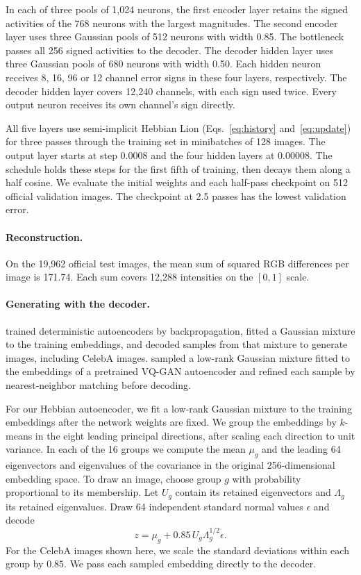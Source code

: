 \documentclass[10pt]{article}
\begin{document}
In each of three pools of 1,024 neurons, the first encoder layer retains the signed activities of the 768 neurons with the largest magnitudes. The second encoder layer uses three Gaussian pools of 512 neurons with width 0.85. The bottleneck passes all 256 signed activities to the decoder. The decoder hidden layer uses three Gaussian pools of 680 neurons with width 0.50. Each hidden neuron receives 8, 16, 96 or 12 channel error signs in these four layers, respectively. The decoder hidden layer covers 12,240 channels, with each sign used twice. Every output neuron receives its own channel's sign directly.

All five layers use semi-implicit Hebbian Lion (Eqs.~\ref{eq:history} and~\ref{eq:update}) for three passes through the training set in minibatches of 128 images. The output layer starts at step $0.0008$ and the four hidden layers at $0.00008$. The schedule holds these steps for the first fifth of training, then decays them along a half cosine. We evaluate the initial weights and each half-pass checkpoint on 512 official validation images. The checkpoint at 2.5 passes has the lowest validation error.

\paragraph{Reconstruction.}
On the 19,962 official test images, the mean sum of squared RGB differences per image is 171.74. Each sum covers 12,288 intensities on the $[0,1]$ scale.

\paragraph{Generating with the decoder.}
\citet[Section~4]{ghosh2020} trained deterministic autoencoders by backpropagation, fitted a Gaussian mixture to the training embeddings, and decoded samples from that mixture to generate images, including CelebA images. \citet{samuth2024} sampled a low-rank Gaussian mixture fitted to the embeddings of a pretrained VQ-GAN autoencoder and refined each sample by nearest-neighbor matching before decoding.

For our Hebbian autoencoder, we fit a low-rank Gaussian mixture to the training embeddings after the network weights are fixed. We group the embeddings by $k$-means in the eight leading principal directions, after scaling each direction to unit variance. In each of the 16 groups we compute the mean $\mu_g$ and the leading 64 eigenvectors and eigenvalues of the covariance in the original 256-dimensional embedding space. To draw an image, choose group $g$ with probability proportional to its membership. Let $U_g$ contain its retained eigenvectors and $\Lambda_g$ its retained eigenvalues. Draw 64 independent standard normal values $\epsilon$ and decode
\begin{equation}
 z=\mu_g+0.85\,U_g\Lambda_g^{1/2}\epsilon .
\end{equation}
For the CelebA images shown here, we scale the standard deviations within each group by $0.85$. We pass each sampled embedding directly to the decoder.
\end{document}
